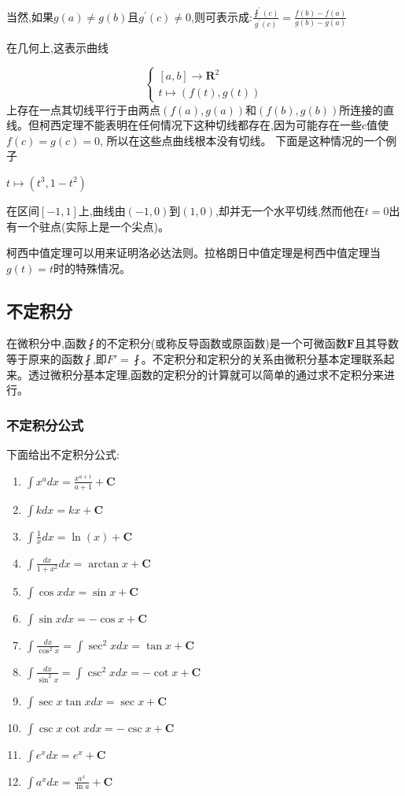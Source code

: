 \documentclass[UTF8]{ctexbook}
\newcommand{\derivative}{^\prime}
\newcommand{\fDerivative}[1]{\fint\derivative(#1)}
\newcommand{\defFunction}[1]{f(#1)}
\newcommand{\mathConstant}{\mathbf{C}}
\begin{document}
{{{{  当然,如果$g(a) \neq g(b)$且$g\derivative(c) \neq 0$,则可表示成:$\frac{\fDerivative{c}}{g\derivative(c)} = \frac{\defFunction{b} - \defFunction{a}}{g(b) - g(a)}$

  在几何上,这表示曲线

  $$
    \begin{cases}
      [a,b] \to \mathbf{R}^2 \\
      t \mapsto (f(t), g(t))
    \end{cases}
  $$
  上存在一点其切线平行于由两点$(\defFunction{a}, g(a))$和$(\defFunction{b}, g(b))$所连接的直线。但柯西定理不能表明在任何情况下这种切线都存在,因为可能存在一些c值使$\defFunction{c} = g(c) = 0$, 所以在这些点曲线根本没有切线。
  下面是这种情况的一个例子

  $t \mapsto (t^3, 1-t^2)$

  在区间$[-1,1]$上,曲线由$(-1, 0)$到$(1,0)$,却并无一个水平切线,然而他在$t = 0$出有一个驻点(实际上是一个尖点)。

  柯西中值定理可以用来证明洛必达法则。拉格朗日中值定理是柯西中值定理当$g(t) = t$时的特殊情况。
}%

}%

\subsection{不定积分}{
  在微积分中,函数$\fint$的不定积分(或称反导函数或原函数)是一个可微函数$\mathbf{F}$且其导数等于原来的函数$\fint$,即$F\prime = \fint$。不定积分和定积分的关系由微积分基本定理联系起来。透过微积分基本定理,函数的定积分的计算就可以简单的通过求不定积分来进行。

  \subsubsection{不定积分公式}{
    下面给出不定积分公式:

    \begin{enumerate}
      \item $\int x^adx = \frac{x^{a+1}}{a+1} + \mathConstant$
      \item $\int kdx = kx + \mathConstant$
      \item $\int \frac{1}{x}dx = \ln(x) + \mathConstant$
      \item $\int \frac{dx}{1+x^2}dx = \arctan x + \mathConstant$
      \item $\int \cos xdx = \sin x + \mathConstant$
      \item $\int \sin xdx = -\cos x + \mathConstant$
      \item $\int \frac{dx}{\cos^2x} = \int \sec^2xdx = \tan x + \mathConstant$
      \item $\int \frac{dx}{\sin^2x} = \int\csc^2xdx = -\cot x + \mathConstant$
      \item $\int \sec x\tan xdx = \sec x + \mathConstant$
      \item $\int \csc x\cot xdx = -\csc x + \mathConstant$
      \item $\int e^xdx = e^x + \mathConstant$
      \item $\int a^xdx = \frac{a^x}{\ln a} + \mathConstant$
    \end{enumerate}

}}}}
\end{document}

